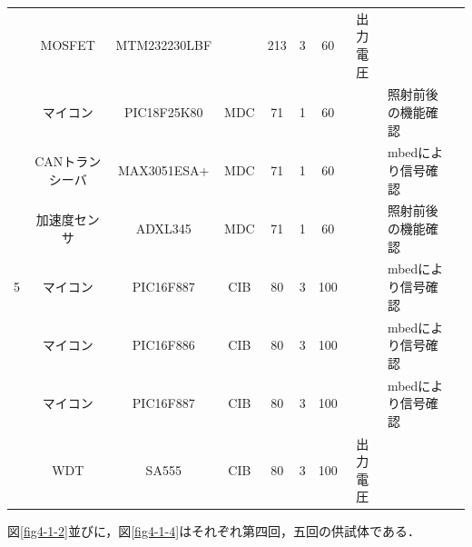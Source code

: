 \begin{landscape}
\begin{table}[htbp]
\begin{tabular}{c|c|c|c|c|c|c|c|l|l}
		& MOSFET               & MTM232230LBF         &                      & 213                  & 3                    & 60                   & 出力電圧                 &                      &                       \\
		& マイコン                 & PIC18F25K80          & MDC                  & 71                   & 1                    & 60                   &                      & 照射前後の機能確認            &                       \\
		& CANトランシーバ            & MAX3051ESA+          & MDC                  & 71                   & 1                    & 60                   &                      & mbedにより信号確認          &                       \\
		& 加速度センサ               & ADXL345              & MDC                  & 71                   & 1                    & 60                   &                      & 照射前後の機能確認             &                       \\\hline
		5   & マイコン                 & PIC16F887            & CIB                  & 80                   & 3                    & 100                  &                      & mbedにより信号確認          &                       \\
		& マイコン                 & PIC16F886            & CIB                  & 80                   & 3                    & 100                  &                      & mbedにより信号確認          &                       \\
		& マイコン                 & PIC16F887            & CIB                  & 80                   & 3                    & 100                  &                      & mbedにより信号確認          &                       \\
		& WDT                  & SA555                & CIB                  & 80                   & 3                    & 100                  & 出力電圧                 &                      &  \\ \hline\hline
	\end{tabular}
\end{table}
\end{landscape}

図\ref{fig4-1-2}並びに，図\ref{fig4-1-4}はそれぞれ第四回，五回の供試体である．

